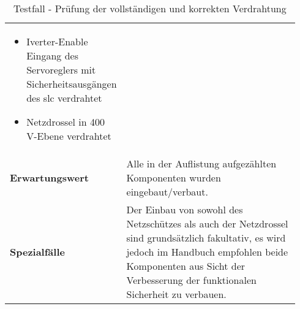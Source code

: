 \documentclass[../../../Bachelorarbeit.tex]{subfiles}
\begin{document}
\begin{table}[H]
\begin{tabular}{ p{0.34\linewidth}  p{0.6\linewidth} }
{\begin{itemize}[noitemsep,topsep=0pt,parsep=0pt,partopsep=0pt,leftmargin=*]
                                                \item Iverter-Enable Eingang des Servoreglers mit Sicherheitsausgängen des \acs{slc} verdrahtet
                                                \item Netzdrossel in 400 \si{V}-Ebene verdrahtet
                                            \end{itemize}} \\
        \textbf{Erwartungswert}         & Alle in der Auflistung aufgezählten Komponenten wurden eingebaut/verbaut. \\
        \textbf{Spezialfälle}           & Der Einbau von sowohl des Netzschützes als auch der Netzdrossel sind grundsätzlich fakultativ, es wird jedoch im Handbuch empfohlen beide Komponenten aus Sicht der Verbesserung der funktionalen Sicherheit zu verbauen. \\ \hline
    \end{tabular}
    \caption[\acs{tf} - Verdrahtungsprüfung]{Testfall - Prüfung der vollständigen und korrekten Verdrahtung}
    \label{tab:my-table61}
\end{table}
\end{document}
